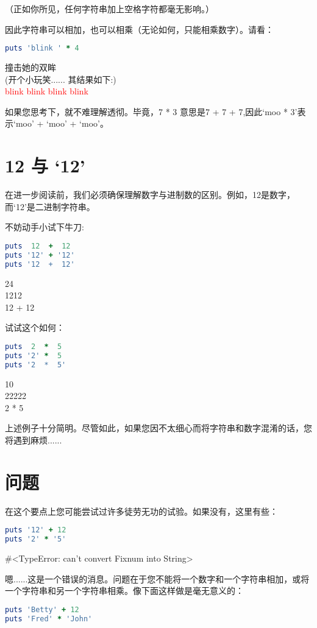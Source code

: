 （正如你所见，任何字符串加上空格字符都毫无影响。）

因此字符串可以相加，也可以相乘（无论如何，只能相乘数字）。请看：
\begin{lstlisting}[language=ruby]
puts 'blink ' * 4
\end{lstlisting}
撞击她的双眸\\
(开个小玩笑...... 其结果如下:)\\
\textcolor{red}{
blink blink blink blink
}

如果您思考下，就不难理解透彻。毕竟，7 * 3 意思是7 + 7 + 7,因此`moo * 3'表示`moo' + `moo' + `moo'。

\section{12 与 `12'}

在进一步阅读前，我们必须确保理解数字与进制数的区别。例如，12是数字，而`12'是二进制字符串。

不妨动手小试下牛刀:
\begin{lstlisting}[language=ruby]
puts  12  +  12
puts '12' + '12'
puts '12  +  12'
\end{lstlisting}
24\\
1212\\
12  +  12

试试这个如何：
\begin{lstlisting}[language=ruby]
puts  2  *  5
puts '2' *  5
puts '2  *  5'
\end{lstlisting}
10\\
22222\\
2  *  5

上述例子十分简明。尽管如此，如果您因不太细心而将字符串和数字混淆的话，您将遇到麻烦......

\section{问题}

在这个要点上您可能尝试过许多徒劳无功的试验。如果没有，这里有些：
\begin{lstlisting}[language=ruby]
puts '12' + 12
puts '2' * '5'
\end{lstlisting}
\#<TypeError: can't convert Fixnum into String>

嗯......这是一个错误的消息。问题在于您不能将一个数字和一个字符串相加，或将一个字符串和另一个字符串相乘。像下面这样做是毫无意义的：
\begin{lstlisting}[language=ruby]
puts 'Betty' + 12
puts 'Fred' * 'John'
\end{lstlisting}

